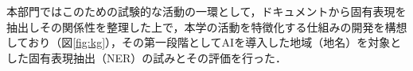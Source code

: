 本部門ではこのための試験的な活動の一環として，ドキュメントから固有表現を抽出しその関係性を整理した上で，本学の活動を特徴化する仕組みの開発を構想しており（図\ref{fig:kg}），その第一段階としてAIを導入した地域（地名）を対象とした固有表現抽出（NER）の試みとその評価を行った．
